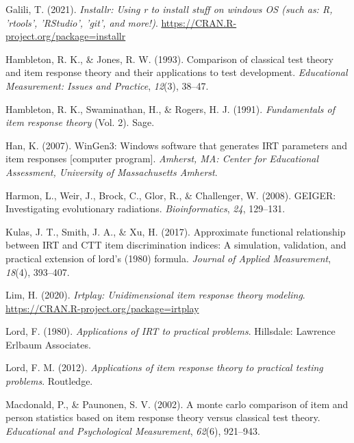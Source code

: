 \documentclass[
  man]{apa6}
\newlength{\cslhangindent}
\newlength{\cslentryspacingunit} %
\newenvironment{CSLReferences}[2] %
 {%
  \setlength{\parindent}{0pt}
  \ifodd #1
  \let\oldpar\par
  \def\par{\hangindent=\cslhangindent\oldpar}
  \fi
  \setlength{\parskip}{#2\cslentryspacingunit}
 }%
 {}
\begin{document}
\begin{CSLReferences}{1}{0}
\leavevmode{}%
Galili, T. (2021). \emph{Installr: Using r to install stuff on windows OS (such as: R, 'rtools', 'RStudio', 'git', and more!)}. \url{https://CRAN.R-project.org/package=installr}

\leavevmode{}%
Hambleton, R. K., \& Jones, R. W. (1993). Comparison of classical test theory and item response theory and their applications to test development. \emph{Educational Measurement: Issues and Practice}, \emph{12}(3), 38--47.

\leavevmode{}%
Hambleton, R. K., Swaminathan, H., \& Rogers, H. J. (1991). \emph{Fundamentals of item response theory} (Vol. 2). Sage.

\leavevmode{}%
Han, K. (2007). WinGen3: Windows software that generates IRT parameters and item responses {[}computer program{]}. \emph{Amherst, MA: Center for Educational Assessment, University of Massachusetts Amherst}.

\leavevmode{}%
Harmon, L., Weir, J., Brock, C., Glor, R., \& Challenger, W. (2008). GEIGER: Investigating evolutionary radiations. \emph{Bioinformatics}, \emph{24}, 129--131.

\leavevmode{}%
Kulas, J. T., Smith, J. A., \& Xu, H. (2017). Approximate functional relationship between IRT and CTT item discrimination indices: A simulation, validation, and practical extension of lord's (1980) formula. \emph{Journal of Applied Measurement}, \emph{18}(4), 393--407.

\leavevmode{}%
Lim, H. (2020). \emph{Irtplay: Unidimensional item response theory modeling}. \url{https://CRAN.R-project.org/package=irtplay}

\leavevmode{}%
Lord, F. (1980). \emph{Applications of IRT to practical problems}. Hillsdale: Lawrence Erlbaum Associates.

\leavevmode{}%
Lord, F. M. (2012). \emph{Applications of item response theory to practical testing problems}. Routledge.

\leavevmode{}%
Macdonald, P., \& Paunonen, S. V. (2002). A monte carlo comparison of item and person statistics based on item response theory versus classical test theory. \emph{Educational and Psychological Measurement}, \emph{62}(6), 921--943.


\end{CSLReferences}
\end{document}
